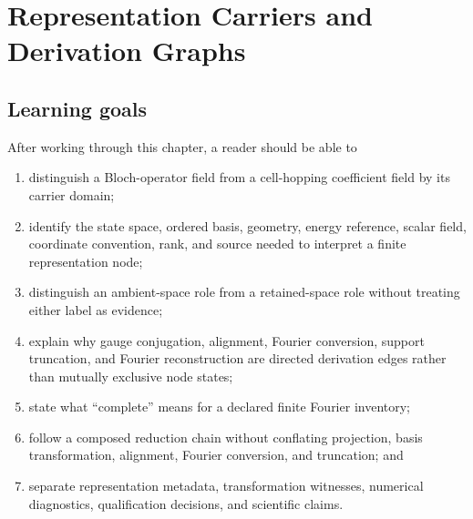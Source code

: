 \chapter{Representation Carriers and Derivation Graphs}

\label{ch:representation-carriers-derivation-graphs}


\section{Learning goals}

After working through this chapter, a reader should be able to

\begin{enumerate}
  \item distinguish a Bloch-operator field from a cell-hopping coefficient
        field by its carrier domain;
  \item identify the state space, ordered basis, geometry, energy reference,
        scalar field, coordinate convention, rank, and source needed to
        interpret a finite representation node;
  \item distinguish an ambient-space role from a retained-space role without
        treating either label as evidence;
  \item explain why gauge conjugation, alignment, Fourier conversion, support
        truncation, and Fourier reconstruction are directed derivation edges
        rather than mutually exclusive node states;
  \item state what ``complete'' means for a declared finite Fourier inventory;
  \item follow a composed reduction chain without conflating projection,
        basis transformation, alignment, Fourier conversion, and truncation;
        and
  \item separate representation metadata, transformation witnesses, numerical
        diagnostics, qualification decisions, and scientific claims.
\end{enumerate}

